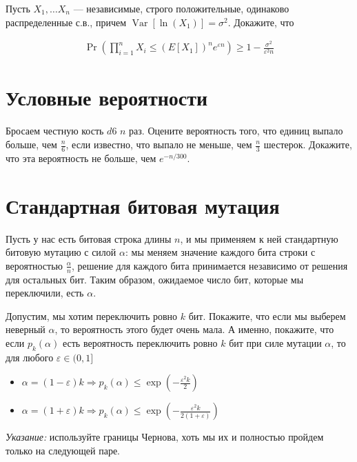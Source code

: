 \documentclass[12pt]{article}
\newcommand\eps{\varepsilon}
\DeclareMathOperator{\Var}{Var}
\begin{document}
Пусть $X_1, \dots X_n$ --- независимые, строго положительные, одинаково распределенные с.в., причем $\Var[\ln(X_1)] = \sigma^2$. Докажите, что

\begin{align*}
    \Pr\left(\prod_{i = 1}^n X_i \le (E[X_1])^n e^{\eps n}\right) \ge 1 - \frac{\sigma^2}{\eps^2 n}
\end{align*}

\section{Условные вероятности}

Бросаем честную кость $d6$ $n$ раз. Оцените вероятность того, что единиц выпало больше, чем $\frac{n}{6}$, если известно, что выпало не меньше, чем $\frac n3$ шестерок. Докажите, что эта вероятность не больше, чем $e^{-n/300}$.

\section{Стандартная битовая мутация}

Пусть у нас есть битовая строка длины $n$, и мы применяем к ней стандартную битовую мутацию с силой $\alpha$: мы меняем значение каждого бита строки с вероятностью $\frac{\alpha}{n}$, решение для каждого бита принимается независимо от решения для остальных бит. Таким образом, ожидаемое число бит, которые мы переключили, есть $\alpha$.

Допустим, мы хотим переключить ровно $k$ бит. Покажите, что если мы выберем неверный $\alpha$, то вероятность этого будет очень мала. А именно, покажите, что если $p_k(\alpha)$ есть вероятность переключить ровно $k$ бит при силе мутации $\alpha$, то для любого $\eps \in (0, 1]$
\begin{itemize}
    \item $\alpha = (1 - \eps)k \Rightarrow p_k(\alpha) \le \exp(-\frac{\eps^2 k}{2})$
    \item $\alpha = (1 + \eps)k \Rightarrow p_k(\alpha) \le \exp(-\frac{\eps^2 k}{2(1 + \eps)})$
\end{itemize}

\emph{Указание:} используйте границы Чернова, хоть мы их и полностью пройдем только на следующей паре.
\end{document}
